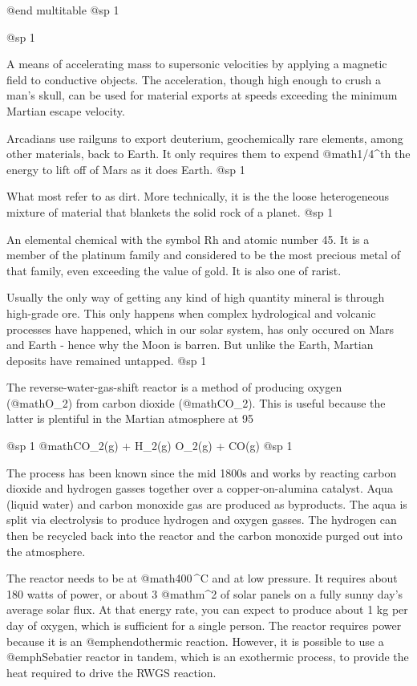 @end multitable
@sp 1

@sp 1

A means of accelerating mass to supersonic velocities by applying a magnetic field to conductive objects. The acceleration, though high enough to crush a man's skull, can be used for material exports at speeds exceeding the minimum Martian escape velocity.

Arcadians use railguns to export deuterium, geochemically rare elements, among other materials, back to Earth. It only requires them to expend @math{{1/4}^{th}} the energy to lift off of Mars as it does Earth.
@sp 1

What most refer to as dirt. More technically, it is the the loose heterogeneous mixture of material that blankets the solid rock of a planet.
@sp 1

An elemental chemical with the symbol Rh and atomic number 45. It is a member of the platinum family and considered to be the most precious metal of that family, even exceeding the value of gold. It is also one of rarist. 

Usually the only way of getting any kind of high quantity mineral is through high-grade ore. This only happens when complex hydrological and volcanic processes have happened, which in our solar system, has only occured on Mars and Earth - hence why the Moon is barren. But unlike the Earth, Martian deposits have remained untapped.
@sp 1

The reverse-water-gas-shift reactor is a method of producing oxygen (@math{O_2}) from carbon dioxide (@math{CO_2}). This is useful because the latter is plentiful in the Martian atmosphere at 95 %

@sp 1
@math{CO_2(g) + H_2(g) \rightarrow O_2(g) + CO(g)}
@sp 1

The process has been known since the mid 1800s and works by reacting carbon dioxide and hydrogen gasses together over a copper-on-alumina catalyst. Aqua (liquid water) and carbon monoxide gas are produced as byproducts. The aqua is split via electrolysis to produce hydrogen and oxygen gasses. The hydrogen can then be recycled back into the reactor and the carbon monoxide purged out into the atmosphere.

The reactor needs to be at @math{400\,^{\circ}{\rm C}} and at low pressure. It requires about 180 watts of power, or about 3 @math{m^2} of solar panels on a fully sunny day's average solar flux. At that energy rate, you can expect to produce about 1 kg per day of oxygen, which is sufficient for a single person. The reactor requires power because it is an @emph{endothermic reaction}. However, it is possible to use a @emph{Sebatier reactor} in tandem, which is an exothermic process, to provide the heat required to drive the RWGS reaction.


